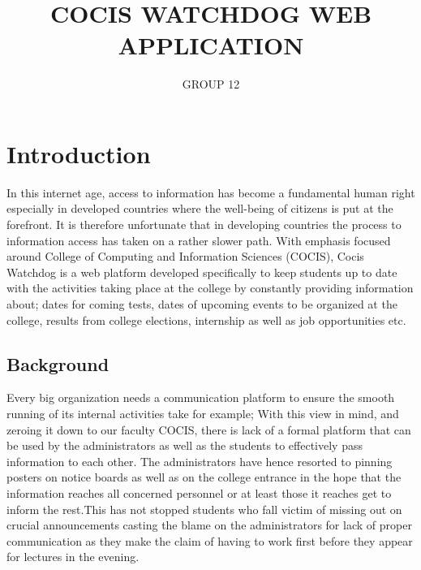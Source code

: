 \documentclass{article}
\begin{document}
\title{COCIS WATCHDOG WEB APPLICATION}
\author{GROUP 12}

\maketitle

\section{Introduction}

In this internet age, access to information has become a fundamental human right especially in developed countries where the well-being of citizens is put at the forefront. It is therefore unfortunate that in developing countries the process to information access has taken on a rather slower path. With emphasis focused around College of Computing and Information Sciences (COCIS), Cocis Watchdog is a web platform developed specifically to keep students up to date with the activities taking place at the college by constantly providing information about; dates for coming tests, dates of upcoming events to be organized at the college, results from college elections, internship as well as job opportunities etc.

\subsection{Background}
Every big organization needs a communication platform to ensure the smooth running of its internal activities take for example;
With this view in mind, and zeroing it down to our faculty COCIS, there is lack of a formal platform that can be used by the administrators as well as the students to effectively pass information to each other. The administrators have hence resorted to pinning posters on notice boards as well as on the college entrance in the hope that the information reaches all concerned personnel or at least those it reaches get to inform the rest.This has not stopped students who fall victim of missing out on crucial announcements casting the blame on the administrators for lack of proper communication as they make the claim of having to work first before they appear for lectures in the evening.
\end{document}
